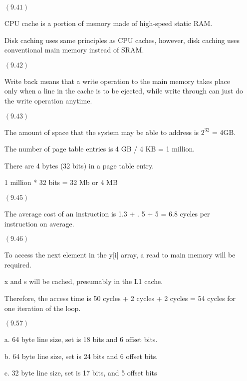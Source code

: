 \documentclass[letterpaper,10pt,titlepage]{article}
\begin{document}
\begin{enumerate}
\item[$(9.41)$]

  CPU cache is a portion of memory made of high-speed static RAM.
  
  Disk caching uses same principles as CPU caches, however, disk caching uses conventional main memory instead of SRAM.

\item[$(9.42)$]

  Write back means that a write operation to the main memory takes place only when a line in the cache is to be ejected, 
  while write through can just do the write operation anytime.

\item[$(9.43)$]

  The amount of space that the system may be able to address is $2^{32}$ = 4GB.
  
  The number of page table entries is 4 GB / 4 KB = 1 million.
  
  There are 4 bytes (32 bits) in a page table entry.
  
  1 million * 32 bits = 32 Mb or 4 MB

\item[$(9.45)$]

  The average cost of an instruction is 1.3 + . 5 + 5 = 6.8 cycles per instruction on average.

\item[$(9.46)$]

  To access the next element in the y[i] array, a read to main memory will be required.
  
  x and s will be cached, presumably in the L1 cache.
  
  Therefore, the access time is 50 cycles + 2 cycles + 2 cycles = 54 cycles for one iteration of the loop.

\item[$(9.57)$]
  
  a. 64 byte line size, set is 18 bits and 6 offset bits.

  b. 64 byte line size, set is 24 bits and 6 offset bits.

  c. 32 byte line size, set is 17 bits, and 5 offset bits
  
\end{enumerate}
\end{document}
